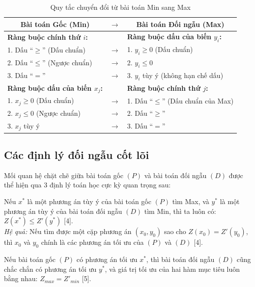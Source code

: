 \begin{table}[htbp]
    \centering
    \renewcommand{\arraystretch}{1.5}
    \begin{tabular}{|l|c|l|}
        \hline
        \multicolumn{1}{|c|}{\textbf{Bài toán Gốc (Min)}} & \textbf{$\rightarrow$} & \multicolumn{1}{c|}{\textbf{Bài toán Đối ngẫu (Max)}} \\
        \hline
        \textbf{Ràng buộc chính thứ $i$:} & & \textbf{Ràng buộc dấu của biến $y_i$:} \\
        1. Dấu ``$\ge$'' (Dấu chuẩn) & $\rightarrow$ & 1. $y_i \ge 0$ (Dấu chuẩn) \\
        2. Dấu ``$\le$'' (Ngược chuẩn) & $\rightarrow$ & 2. $y_i \le 0$ \\
        3. Dấu ``$=$'' & $\rightarrow$ & 3. $y_i$ tùy ý (không hạn chế dấu) \\
        \hline
        \textbf{Ràng buộc dấu của biến $x_j$:} & & \textbf{Ràng buộc chính thứ $j$:} \\
        1. $x_j \ge 0$ (Dấu chuẩn) & $\rightarrow$ & 1. Dấu ``$\le$'' (Dấu chuẩn của Max) \\
        2. $x_j \le 0$ (Ngược chuẩn) & $\rightarrow$ & 2. Dấu ``$\ge$'' \\
        3. $x_j$ tùy ý & $\rightarrow$ & 3. Dấu ``$=$'' \\
        \hline
    \end{tabular}
    \caption{Quy tắc chuyển đổi từ bài toán Min sang Max}
    \label{tab:doi_ngau_min_max}
\end{table}

\subsection{Các định lý đối ngẫu cốt lõi}
Mối quan hệ chặt chẽ giữa bài toán gốc $(P)$ và bài toán đối ngẫu $(D)$ được thể hiện qua 3 định lý toán học cực kỳ quan trọng sau:

\begin{theorem}
Nếu $x^*$ là một phương án tùy ý của bài toán gốc $(P)$ tìm Max, và $y^*$ là một phương án tùy ý của bài toán đối ngẫu $(D)$ tìm Min, thì ta luôn có: $Z(x^*) \le Z'(y^*)$ [4]. \\
\textit{Hệ quả:} Nếu tìm được một cặp phương án $(x_0, y_0)$ sao cho $Z(x_0) = Z'(y_0)$, thì $x_0$ và $y_0$ chính là các phương án tối ưu của $(P)$ và $(D)$ [4].
\end{theorem}

\begin{theorem}
Nếu bài toán gốc $(P)$ có phương án tối ưu $x^*$, thì bài toán đối ngẫu $(D)$ cũng chắc chắn có phương án tối ưu $y^*$, và giá trị tối ưu của hai hàm mục tiêu luôn bằng nhau: $Z_{max} = Z'_{min}$ [5].
\end{theorem}

